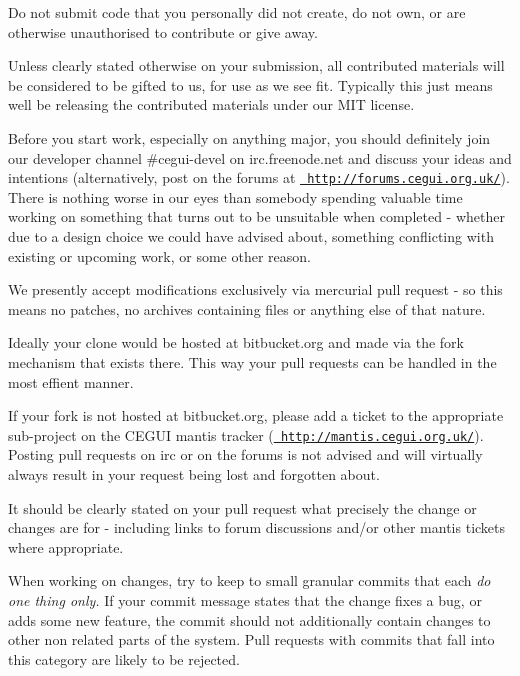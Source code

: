 \begin{DoxyItemize}
\item Do not submit code that you personally did not create, do not own, or are otherwise unauthorised to contribute or give away.
\item Unless clearly stated otherwise on your submission, all contributed materials will be considered to be gifted to us, for use as we see fit. Typically this just means we\textquotesingle{}ll be releasing the contributed materials under our M\+IT license.
\item Before you start work, especially on anything major, you should definitely join our developer channel \#cegui-\/devel on irc.\+freenode.\+net and discuss your ideas and intentions (alternatively, post on the forums at \href{http://forums.cegui.org.uk/}{\texttt{ http\+://forums.\+cegui.\+org.\+uk/}}). There is nothing worse in our eyes than somebody spending valuable time working on something that turns out to be unsuitable when completed -\/ whether due to a design choice we could have advised about, something conflicting with existing or upcoming work, or some other reason.
\item We presently accept modifications exclusively via mercurial pull request -\/ so this means no patches, no archives containing files or anything else of that nature.
\item Ideally your clone would be hosted at bitbucket.\+org and made via the fork mechanism that exists there. This way your pull requests can be handled in the most effient manner.
\item If your fork is not hosted at bitbucket.\+org, please add a ticket to the appropriate sub-\/project on the C\+E\+G\+UI mantis tracker (\href{http://mantis.cegui.org.uk/}{\texttt{ http\+://mantis.\+cegui.\+org.\+uk/}}). Posting pull requests on irc or on the forums is not advised and will virtually always result in your request being lost and forgotten about.
\item It should be clearly stated on your pull request what precisely the change or changes are for -\/ including links to forum discussions and/or other mantis tickets where appropriate.
\item When working on changes, try to keep to small granular commits that each {\itshape do one thing only.} If your commit message states that the change fixes a bug, or adds some new feature, the commit should not additionally contain changes to other non related parts of the system. Pull requests with commits that fall into this category are likely to be rejected.

\end{DoxyItemize}
